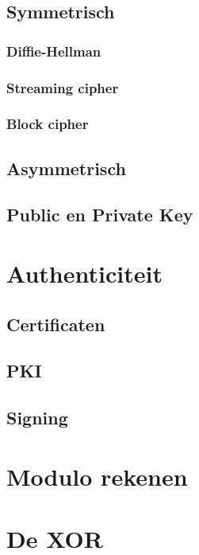 \documentclass[a4paper,12pt,twoside,openright,titlepage]{book}
\begin{document}
\section{Symmetrisch}

\subsection{Diffie-Hellman}

\subsection{Streaming cipher}


\subsection{Block cipher}



\section{Asymmetrisch}

\section{Public en Private Key}


\chapter{Authenticiteit}

\section{Certificaten}

\section{PKI}

\section{Signing}


\begin{appendices}
	\chapter{Modulo rekenen}\label{chap:modulo}

	\chapter{De XOR}\label{chap:xor}

\end{appendices}

\printindex
\end{document}
